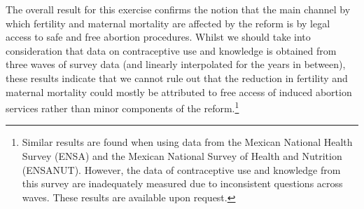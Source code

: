 \documentclass[a4paper, 11pt]{article}
\begin{document}
\begin{spacing}{2}
The overall result for this exercise confirms the notion that the main channel by which fertility and maternal mortality are affected by the reform is by legal access to safe and free abortion procedures. Whilst we should take into consideration that data on contraceptive use and knowledge is obtained from three waves of survey data (and linearly interpolated for the years in between), these results indicate that we cannot rule out that the reduction in fertility and maternal mortality could mostly be attributed to free access of induced abortion services rather than minor components of the reform.\footnote{Similar results are found when using data from the Mexican National Health Survey (ENSA) and the Mexican National Survey of Health and Nutrition (ENSANUT). However, the data of contraceptive use and knowledge from this survey are inadequately measured due to inconsistent questions across waves. These results are available upon request.}



\end{spacing}
\end{document}
